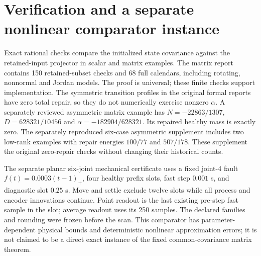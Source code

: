 \documentclass[11pt]{article}
\begin{document}
\section{Verification and a separate nonlinear comparator instance}
Exact rational checks compare the initialized state covariance against the
retained-input projector in scalar and matrix examples. The matrix report
contains 150 retained-subset checks and 68 full calendars, including rotating,
nonnormal and Jordan models. The proof is universal; these finite checks
support implementation. The symmetric transition profiles in the original
formal reports have zero total repair, so they do not numerically exercise
nonzero $\alpha$. A separately reviewed asymmetric matrix example has
$N=-22863/1307$, $D=628321/10456$ and $\alpha=-182904/628321$.
Its repaired healthy mass is exactly zero. The separately reproduced
six-case asymmetric supplement includes two low-rank examples with repair
energies $100/77$ and $507/178$. These supplement the original zero-repair
checks without changing their historical counts.

The separate planar six-joint mechanical certificate uses a fixed joint-4
fault $f(t)=0.0003(t-1)_+$, four healthy prefix slots, fast step $0.001$ s,
and diagnostic slot $0.25$ s. Move and settle exclude twelve slots while
all process and encoder innovations continue. Point readout is the last
existing pre-step fast sample in the slot; average readout uses its 250 samples.
The declared families and rounding were frozen before the scan.
This comparator has parameter-dependent physical bounds and deterministic
nonlinear approximation errors; it is not claimed to be a direct exact
instance of the fixed common-covariance matrix theorem.
\end{document}
